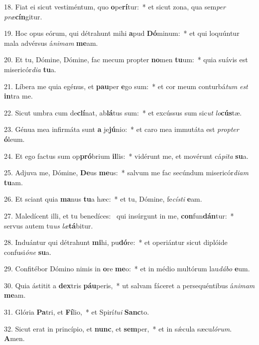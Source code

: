 18. Fiat ei sicut vestiméntum, quo \textbf{o}pe\textbf{rí}tur:~*  et sicut zona, qua sem\textit{per} \textit{præ}\textbf{cín}gitur.\

19. Hoc opus eórum, qui détrahunt mihi \textbf{a}pud \textbf{Dó}minum:~*  et qui loquúntur mala advérsus á\textit{ni}\textit{mam} \textbf{me}am.\

20. Et tu, Dómine, Dómine, fac mecum propter \textbf{no}men \textbf{tu}um:~*  quia suávis est misericór\textit{di}\textit{a} \textbf{tu}a.\

21. Líbera me quia egénus, et \textbf{pau}per \textbf{e}go sum:~*  et cor meum conturbá\textit{tum} \textit{est} \textbf{in}tra me.\

22. Sicut umbra cum de\textbf{clí}nat, ab\textbf{lá}tus sum:~*  et excússus sum sic\textit{ut} \textit{lo}\textbf{cús}tæ.\

23. Génua mea infirmáta sunt \textbf{a} je\textbf{jú}nio:~*  et caro mea immutáta est \textit{prop}\textit{ter} \textbf{ó}leum.\

24. Et ego factus sum op\textbf{pró}brium \textbf{il}lis:~*  vidérunt me, et movérunt cá\textit{pi}\textit{ta} \textbf{su}a.\

25. Adjuva me, Dómine, \textbf{De}us \textbf{me}us:~*  salvum me fac secúndum misericór\textit{di}\textit{am} \textbf{tu}am.\

26. Et sciant quia \textbf{ma}nus \textbf{tu}a hæc:~*  et tu, Dómine, fe\textit{cís}\textit{ti} \textbf{e}am.\

27. Maledícent illi, et tu benedíces: \dag\  qui insúrgunt in me, \textbf{con}fun\textbf{dán}tur:~*  servus autem tu\textit{us} \textit{læ}\textbf{tá}bitur.\

28. Induántur qui détrahunt \textbf{mi}hi, pu\textbf{dó}re:~*  et operiántur sicut diplóide confusi\textit{ó}\textit{ne} \textbf{su}a.\

29. Confitébor Dómino nimis in \textbf{o}re \textbf{me}o:~*  et in médio multórum lau\textit{dá}\textit{bo} \textbf{e}um.\

30. Quia ástitit a \textbf{dex}tris \textbf{páu}peris,~*  ut salvam fáceret a persequéntibus á\textit{ni}\textit{mam} \textbf{me}am.\

31. Glória \textbf{Pa}tri, et \textbf{Fí}lio,~*  et Spirí\textit{tu}\textit{i} \textbf{Sanc}to.\

32. Sicut erat in princípio, et \textbf{nunc}, et \textbf{sem}per,~*  et in sǽcula sæcu\textit{ló}\textit{rum}. \textbf{A}men.\

